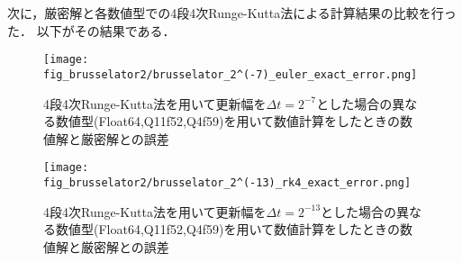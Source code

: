 次に，厳密解と各数値型での4段4次Runge-Kutta法による計算結果の比較を行った．
以下がその結果である．\\
\begin{figure}[H]
    \centering
    \begin{minipage}[b]{0.49\columnwidth}
        \centering
        \texttt{[image: fig\_brusselator2/brusselator\_2^(-7)\_euler\_exact\_error.png]}
        \caption{4段4次Runge-Kutta法を用いて更新幅を$\Delta t = 2^{-7}$とした場合の異なる数値型(Float64,Q11f52,Q4f59)を用いて数値計算をしたときの数値解と厳密解との誤差}
        \label{fig:brusselator_2^(-7)_rk4_exact_error}
    \end{minipage}
    \begin{minipage}[b]{0.49\columnwidth}
        \centering
        \texttt{[image: fig\_brusselator2/brusselator\_2^(-13)\_rk4\_exact\_error.png]}
        \caption{4段4次Runge-Kutta法を用いて更新幅を$\Delta t =  2^{-13}$とした場合の異なる数値型(Float64,Q11f52,Q4f59)を用いて数値計算をしたときの数値解と厳密解との誤差}
        \label{fig:brusselator_2^(-13)_exact_error}
    \end{minipage}
\end{figure}


